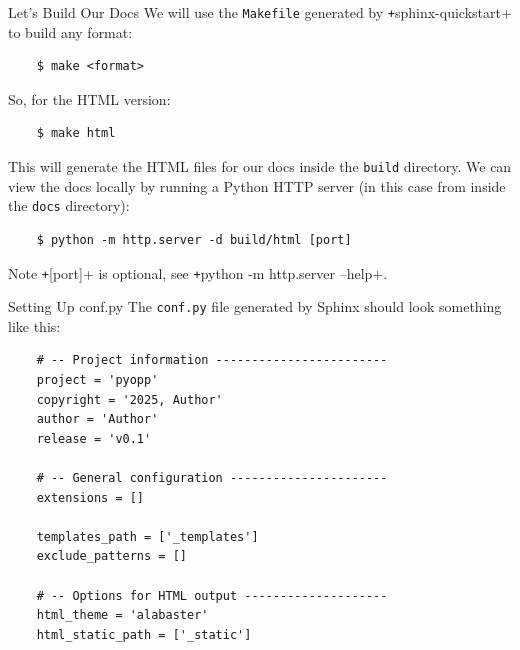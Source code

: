 {
\begin{frame}[fragile]{Let's Build Our Docs}
  We will use the \texttt{Makefile} generated by \texttt+sphinx-quickstart+ to build any format:
  \begin{verbatim}
    $ make <format>
  \end{verbatim}
  So, for the HTML version:
  \begin{verbatim}
    $ make html
  \end{verbatim}
  This will generate the HTML files for our docs inside the \texttt{build} directory.
  We can view the docs locally by running a Python HTTP server (in this case from inside the \texttt{docs} directory):
  \begin{verbatim}
    $ python -m http.server -d build/html [port]
  \end{verbatim}

  \begin{block}{Note}
    \texttt+[port]+ is optional, see \texttt+python -m http.server --help+.
  \end{block}
\end{frame}
}

\begin{darkframe}[fragile]{Setting Up conf.py}
  The \texttt{conf.py} file generated by Sphinx should look something like this:
  \begin{verbatim}
    # -- Project information ------------------------
    project = 'pyopp'
    copyright = '2025, Author'
    author = 'Author'
    release = 'v0.1'

    # -- General configuration ----------------------
    extensions = []

    templates_path = ['_templates']
    exclude_patterns = []

    # -- Options for HTML output --------------------
    html_theme = 'alabaster'
    html_static_path = ['_static']
  \end{verbatim}
\end{darkframe}


